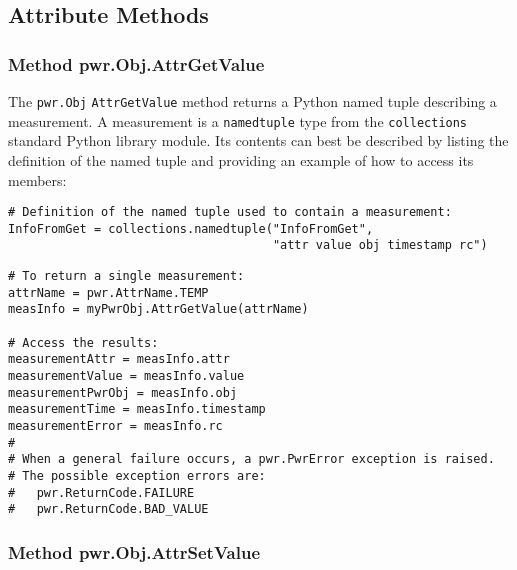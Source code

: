 \documentclass[12pt]{report} %
\begin{document}
\begin{appendices}
\subsection{Attribute Methods} \label{sec:PythonAttributeMethods}

\subsubsection{Method pwr.Obj.AttrGetValue}
\label{meth:ObjAttrGetValue}

The \texttt{pwr.Obj} \texttt{AttrGetValue} method returns a Python named tuple
describing a measurement. A measurement is a \texttt{namedtuple} type from the
\texttt{collections} standard Python library module. Its
contents can best be described by listing the definition of the named tuple and
providing an example of how to access its members:

\begin{center}\begin{minipage}{.95\linewidth}\begin{lstlisting}
# Definition of the named tuple used to contain a measurement:
InfoFromGet = collections.namedtuple("InfoFromGet",
                                     "attr value obj timestamp rc")
\end{lstlisting}\end{minipage}\end{center}

\begin{center}\begin{minipage}{.95\linewidth}\begin{lstlisting}
# To return a single measurement:
attrName = pwr.AttrName.TEMP
measInfo = myPwrObj.AttrGetValue(attrName)

# Access the results:
measurementAttr = measInfo.attr
measurementValue = measInfo.value
measurementPwrObj = measInfo.obj
measurementTime = measInfo.timestamp
measurementError = measInfo.rc
#
# When a general failure occurs, a pwr.PwrError exception is raised.
# The possible exception errors are:
#   pwr.ReturnCode.FAILURE
#   pwr.ReturnCode.BAD_VALUE
\end{lstlisting}\end{minipage}\end{center}

\subsubsection{Method pwr.Obj.AttrSetValue}
\label{meth:ObjAttrSetValue}


\end{appendices}
\end{document}
